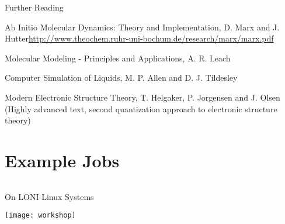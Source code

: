 \documentclass[slidestop,mathserif,compress,xcolor=svgnames]{beamer}
\begin{document}
\begin{frame}[allowframebreaks]
\begin{block}{\small Further Reading}
\begin{itemize}
{\item Ab Initio Molecular Dynamics: Theory and Implementation, D. Marx and J. Hutter{\color{Blue}\url{http://www.theochem.ruhr-uni-bochum.de/research/marx/marx.pdf}}
\item Molecular Modeling - Principles and Applications, A. R. Leach
\item Computer Simulation of Liquids, M. P. Allen and D. J. Tildesley
\item[$\vardiamond$]Modern Electronic Structure Theory, T. Helgaker, P. Jorgensen and J. Olsen (Highly advanced text, second quantization approach to electronic structure theory)
}
\end{itemize}
\end{block}
\end{frame}

\section{Example Jobs}
\begin{frame}
\begin{columns}
\vspace{-0.95cm}
\begin{alertblock}{On LONI Linux Systems}
\begin{center}
\texttt{[image: workshop]}
\end{center}
\end{alertblock}
\end{columns}
\end{frame}
\end{document}
